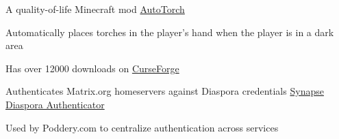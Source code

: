 \begin{cventries}
  \cventry
    {A quality-of-life Minecraft mod} %
    {\href{https://www.curseforge.com/minecraft/mc-mods/auto-torch}{AutoTorch}} %
    {} %
    {} %
    {
      \begin{cvitems} %
        \item {Automatically places torches in the player's hand when the player is in a dark area}
        \item {Has over 12000 downloads on \href{https://www.curseforge.com/minecraft/mc-mods/auto-torch}{CurseForge}}
    \end{cvitems}
    }

  \cventry
    {Authenticates Matrix.org homeservers against Diaspora credentials} %
    {\href{https://matrix.org/docs/projects/other/synapse-diaspora-auth}{Synapse Diaspora Authenticator}} %
    {} %
    {} %
    {
      \begin{cvitems} %
        \item {Used by Poddery.com to centralize authentication across services}
      \end{cvitems}
    }
\end{cventries}
